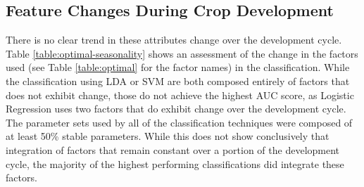 \documentclass[letterpaper]{report}
\begin{document}
\subsection{Feature Changes During Crop Development}
There is no clear trend in these attributes change over the development cycle. Table \ref{table:optimal-seasonality} shows an assessment of the change in the factors used (see Table \ref{table:optimal} for the factor names) in the classification. While the classification using LDA or SVM  are both composed entirely of factors that does not exhibit change, those do not achieve the highest AUC score, as Logistic Regression uses two factors that do exhibit change over the development cycle. The parameter sets used by all of the classification techniques were composed of at least 50\%  stable parameters. While this does not show conclusively that integration of factors that remain constant over a portion of the development cycle, the majority of the highest performing classifications did integrate these factors.
{


}
%
%
%

%
% 

\end{document}
